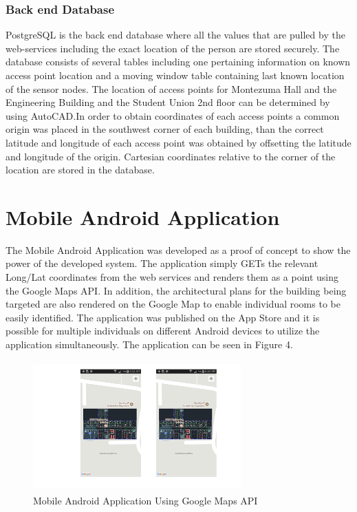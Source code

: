 \documentclass[conference]{IEEEtran}
\begin{document}
\subsubsection{Back end Database}
PostgreSQL is the back end database where all the values that are pulled by the web-services including the exact location of the person are stored securely. The database consists of several tables including one pertaining information on known access point location and a moving window table containing last known location of the sensor nodes. The location of access points for Montezuma Hall and the Engineering Building and the Student Union 2nd floor can be determined by using AutoCAD.In order to obtain coordinates of each access points a common origin was placed in the southwest corner of each building, than the correct latitude and longitude of each access point was obtained by offsetting the latitude and longitude of the origin. Cartesian coordinates relative to the corner of the location are stored in the database.
\newline

\section{Mobile Android Application}
 The Mobile Android Application was developed as a proof of concept to show the power of the developed system. The application simply GETs the relevant Long/Lat coordinates from the web services and renders them as a point using the Google Maps API. In addition, the architectural plans for the building being targeted are also rendered on the Google Map to enable individual rooms to be easily identified. The application was published on the App Store and it is possible for multiple individuals on different Android devices to utilize the application simultaneously. The application can be seen in Figure 4.
\begin{figure}[H]
    \includegraphics[width=8cm,height=5cm]{2018-05-10-PHOTO-00000078.png}
    \caption{Mobile Android Application Using Google Maps API}
    \end{figure}
\end{document}
